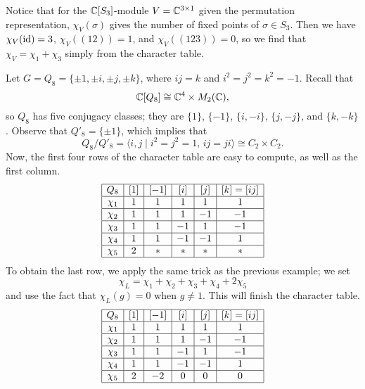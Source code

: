 \begin{remark}{}
    Notice that for the $\mathbb{C}[S_3]$-module $V = \mathbb{C}^{3\times1}$ given the permutation 
    representation, $\chi_V(\sigma)$ gives the number of fixed points of 
    $\sigma \in S_3$. Then we have $\chi_V(\operatorname{id}) = 3$, $\chi_V((12)) = 1$, and 
    $\chi_V((123)) = 0$, so we find that $\chi_V = \chi_1 + \chi_3$ simply from 
    the character table. 
\end{remark}

\begin{exmp}{}
    Let $G = Q_8 = \{\pm1, \pm i, \pm j, \pm k\}$, where $ij = k$ and 
    $i^2 = j^2 = k^2 = -1$. Recall that 
    \[ \mathbb{C}[Q_8] \cong \mathbb{C}^4 \times M_2(\mathbb{C}), \] 
    so $Q_8$ has five conjugacy classes; they are $\{1\}$, $\{-1\}$, 
    $\{i, -i\}$, $\{j, -j\}$, and $\{k, -k\}$. Observe that $Q'_8 = \{\pm1\}$, 
    which implies that 
    \[ Q_8/Q'_8 = \langle i, j \mid i^2 = j^2 = 1,\, ij = ji 
    \rangle \cong C_2 \times C_2 . \] 
    Now, the first four rows of the character table are easy to compute, 
    as well as the first column. 
    \begin{align*}
        \begin{array}{|c|c|c|c|c|c|}
            \hline
            Q_8    & [1] & [-1] & [i] & [j] & [k] = [ij] \\ \hline
            \chi_1 & 1   & 1    & 1   & 1   & 1          \\ \hline
            \chi_2 & 1   & 1    & 1   & -1  & -1         \\ \hline
            \chi_3 & 1   & 1    & -1  & 1   & -1         \\ \hline
            \chi_4 & 1   & 1    & -1  & -1  & 1          \\ \hline
            \chi_5 & 2   & *    & *   & *   & *          \\ \hline 
        \end{array} 
    \end{align*}
    To obtain the last row, we apply the same trick as the previous example; 
    we set 
    \[ \chi_L = \chi_1 + \chi_2 + \chi_3 + \chi_4 + 2\chi_5 \] 
    and use the fact that $\chi_L(g) = 0$ when $g \neq 1$. This will finish 
    the character table.
    \begin{align*}
        \begin{array}{|c|c|c|c|c|c|}
            \hline
            Q_8    & [1] & [-1] & [i] & [j] & [k] = [ij] \\ \hline
            \chi_1 & 1   & 1    & 1   & 1   & 1          \\ \hline
            \chi_2 & 1   & 1    & 1   & -1  & -1         \\ \hline
            \chi_3 & 1   & 1    & -1  & 1   & -1         \\ \hline
            \chi_4 & 1   & 1    & -1  & -1  & 1          \\ \hline
            \chi_5 & 2   & -2   & 0   & 0   & 0          \\ \hline 
        \end{array} 
    \end{align*} 
\end{exmp}

